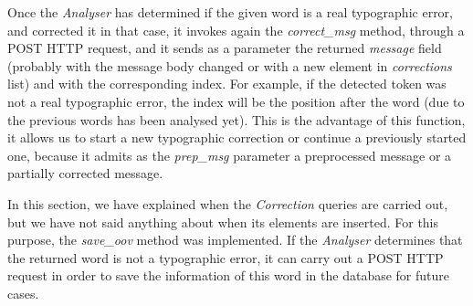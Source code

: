 Once the \textit{Analyser} has determined if the given word is a real typographic error, and corrected it in that case, it invokes again the \textit{correct\_msg} method, through a POST HTTP request, and it sends as a parameter the returned \textit{message} field (probably with the message body changed or with a new element in \textit{corrections} list) and with the corresponding index. For example, if the detected token was not a real typographic error, the index will be the position after the word (due to the previous words has been analysed yet). This is the advantage of this function, it allows us to start a new typographic correction or continue a previously started one, because it admits as the \textit{prep\_msg} parameter a preprocessed message or a partially corrected message.

In this section, we have explained when the \textit{Correction} queries are carried out, but we have not said anything about when its elements are inserted. For this purpose, the \textit{save\_oov} method was implemented. If the \textit{Analyser} determines that the returned word is not a typographic error, it can carry out a POST HTTP request in order to save the information of this word in the database for future cases.